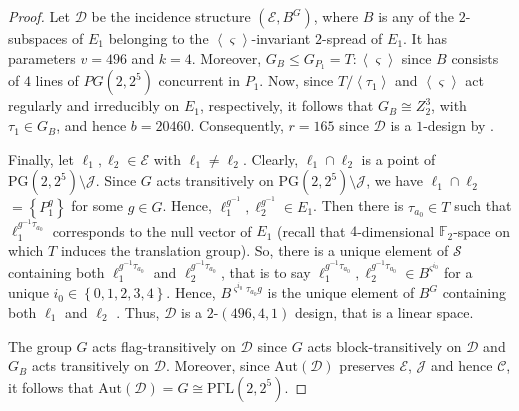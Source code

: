 \documentclass[a4paper,twopage,reqno,12pt]{amsart}
\theoremstyle{definition}
\numberwithin{equation}{section}
\newcommand{\PGaL}{\mathrm{P\Gamma L}}
\newcommand{\Aut}{\mathrm{Aut}}
\newcommand{\PG}{\mathrm{PG}}
\renewcommand{\leq}{\leqslant}
\begin{document}
\begin{proof}
Let $\mathcal{D}$ be the incidence structure $(\mathcal{E},B^{G})$, where $B$
is any of the $2$-subspaces of $E_{1}$ belonging to the $\left\langle
\varsigma \right\rangle $-invariant $2$-spread of $E_{1}$. It has parameters 
$v=496$ and $k=4$. Moreover, $G_{B}\leq G_{P_{1}}=T:\left\langle \varsigma
\right\rangle $ since $B$ consists of $4$ lines of $PG(2,2^{5})$ concurrent in $P_{1}$. Now, since $T/\left\langle \tau _{1}\right\rangle $ and $%
\left\langle \varsigma \right\rangle $ act regularly and irreducibly on $%
E_{1}$, respectively, it follows that $G_{B}\cong Z_{2}^{3}$, with $\tau_{1}\in G_{B}$, and hence $%
b=20460$. Consequently, $r=165$ since $\mathcal{D}$ is a $1$-design by \cite[%
1.2.6]{Demb}.

Finally, let $\ell _{1},\ell _{2}\in \mathcal{E}$ with $\ell _{1}\neq \ell
_{2}$. Clearly, $\ell _{1}\cap \ell _{2}$ is a point of $\PG(2,2^{5})%
\setminus \mathcal{J}$. Since $G$ acts transitively on $\PG(2,2^{5})\setminus 
\mathcal{J}$, we have $\ell _{1}\cap \ell _{2}$ $=\left\{ P_{1}^{g}\right\} $ for some $g \in G$. Hence, $\ell _{1}^{g^{-1}},\ell _{2}^{g^{-1}}\in E_{1}$. Then there is $%
\tau _{a_{0}}\in T$ such that $\ell _{1}^{g^{-1}\tau _{a_{0}}}$ corresponds
to the null vector of $E_{1}$ (recall that $4$-dimensional $\mathbb{F}_{2}$-space on which $T$ induces the translation group). So, there is a unique element of $\mathcal{S}$
containing both $\ell _{1}^{g^{-1}\tau _{a_{0}}}$ and $\ell _{2}^{g^{-1}\tau
_{a_{0}}}$, that is to say $\ell _{1}^{g^{-1}\tau _{a_{0}}},\ell
_{2}^{g^{-1}\tau _{a_{0}}}\in B^{\varsigma ^{i_{0}}}$ for a unique $i_{0}\in
\left\{ 0,1,2,3,4\right\} $. Hence, $B^{\varsigma ^{i_{0}}\tau _{a_{0}}g}$
is the unique element of $B^{G}$ containing both $\ell _{1}$ and $\ell _{2}$%
. Thus, $\mathcal{D}$ is a $2$-$(496,4,1)$ design, that is a linear space.

The group $G$ acts flag-transitively on $\mathcal{D}$ since $G$ acts
block-transitively on $\mathcal{D}$ and $G_{B}$ acts transitively on $%
\mathcal{D}$. Moreover, since $\Aut(\mathcal{D})$ preserves $\mathcal{E}$, $%
\mathcal{J}$ and hence $\mathcal{C}$, it follows that $\Aut(\mathcal{D}%
)=G\cong \PGaL(2,2^{5})$.


\end{proof}
\end{document}
